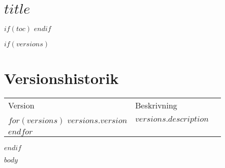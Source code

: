 \documentclass[12pt,a4paper]{article}
\let\endhead\empty
\def\toprule{\hspace{-1mm}} %
\let\midrule\empty
\let\bottomrule\empty
\begin{document}
\section*{$title$}

$if(toc)$
\tableofcontents
$endif$

$if(versions)$
\section{Versionshistorik}
\begin{longtable}[]{@{}lll@{}}
\toprule
Version & Beskrivning\tabularnewline%
\midrule
\endhead%
$for(versions)$
$versions.version$ & $versions.description$\tabularnewline%
$endfor$
\bottomrule
\end{longtable}
$endif$

$body$
\end{document}
